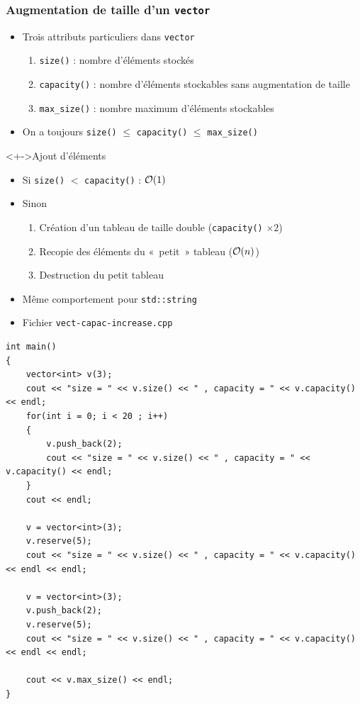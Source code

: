 \begin{frame}
\frametitle{Augmentation de taille d'un \texttt{vector}}
\begin{itemize}[<+->]
\item Trois attributs particuliers dans \texttt{vector}
	\begin{enumerate}
	\item \texttt{size()} : nombre d'éléments stockés
	\item \texttt{capacity()} : nombre d'éléments stockables sans augmentation de taille
	\item \lstinline|max_size()| : nombre maximum d'éléments stockables
	\end{enumerate}
\item On a toujours \lstinline|size()| $\leqslant$ \lstinline|capacity()| $\leqslant$ \lstinline|max_size()|
\end{itemize}
\begin{exampleblock}<+->{Ajout d'éléments}
	\begin{itemize}[<+->]
	\item Si \lstinline|size()| $<$ \lstinline|capacity()| : ${\mathcal{O}}(1)$
	\item Sinon
		\begin{enumerate}
		\item Création d'un tableau de taille double (\lstinline|capacity()| $\times 2$)
		\item Recopie des éléments du «~petit~» tableau (${\mathcal{O}}(n)$)
		\item Destruction du petit tableau
		\end{enumerate}
	\end{itemize}
\end{exampleblock}
\begin{itemize}[<+->]
\item Même comportement pour \texttt{std::string}
\end{itemize}
\end{frame}

\begin{frame}[containsverbatim]
\begin{itemize}
\item Fichier \texttt{vect-capac-increase.cpp}
\end{itemize}
\begin{lstlisting}
int main()
{	
	vector<int> v(3);
	cout << "size = " << v.size() << " , capacity = " << v.capacity() << endl;
	for(int i = 0; i < 20 ; i++)
	{
		v.push_back(2);
		cout << "size = " << v.size() << " , capacity = " << v.capacity() << endl;
	}
	cout << endl;	

	v = vector<int>(3);
	v.reserve(5);
	cout << "size = " << v.size() << " , capacity = " << v.capacity() << endl << endl;

	v = vector<int>(3);
	v.push_back(2);
	v.reserve(5);
	cout << "size = " << v.size() << " , capacity = " << v.capacity() << endl << endl;
	
	cout << v.max_size() << endl;
}
\end{lstlisting}
\end{frame}

